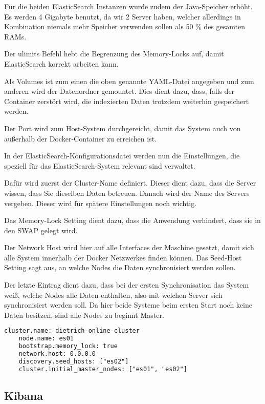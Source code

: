 Für die beiden ElasticSearch Instanzen wurde zudem der Java-Speicher erhöht. Es werden 4 Gigabyte benutzt, da wir 2 Server haben, welcher allerdings in Kombination niemals mehr Speicher verwenden sollen als 50 \% des gesamten RAMs. \cite{ElasticsearchB.V..12172019}

Der ulimits Befehl hebt die Begrenzung des Memory-Locks auf, damit ElasticSearch korrekt arbeiten kann.

Als Volumes ist zum einen die oben genannte YAML-Datei angegeben und zum anderen wird der Datenordner gemountet. Dies dient dazu, dass, falls der Container zerstört wird, die indexierten Daten trotzdem weiterhin gespeichert werden.

Der Port wird zum Host-System durchgereicht, damit das System auch von außerhalb der Docker-Container zu erreichen ist.

In der ElasticSearch-Konfigurationsdatei werden nun die Einstellungen, die speziell für das ElasticSearch-System relevant sind verwaltet. 

Dafür wird zuerst der Cluster-Name definiert. Dieser dient dazu, dass die Server wissen, dass Sie dieselben Daten betreuen. 
Danach wird der Name des Servers vergeben. Dieser wird für spätere Einstellungen noch wichtig.

Das Memory-Lock Setting dient dazu, dass die Anwendung verhindert, dass sie in den SWAP gelegt wird.

Der Network Host wird hier auf alle Interfaces der Maschine gesetzt, damit sich alle System innerhalb der Docker Netzwerkes finden können.
Das Seed-Host Setting sagt aus, an welche Nodes die Daten synchronisiert werden sollen.

Der letzte Eintrag dient dazu, dass bei der ersten Synchronisation das System weiß, welche Nodes alle Daten enthalten, also mit welchen Server sich synchronisiert werden soll. Da hier beide Systeme beim ersten Start noch keine Daten besitzen, sind alle Nodes zu beginnt Master. 
\begin{lstlisting}[language=XML, frame=single, label={lst:es01-yml}] 
	cluster.name: dietrich-online-cluster
	node.name: es01
	bootstrap.memory_lock: true
	network.host: 0.0.0.0
	discovery.seed_hosts: ["es02"]
	cluster.initial_master_nodes: ["es01", "es02"]
\end{lstlisting}

\subsection{Kibana}


